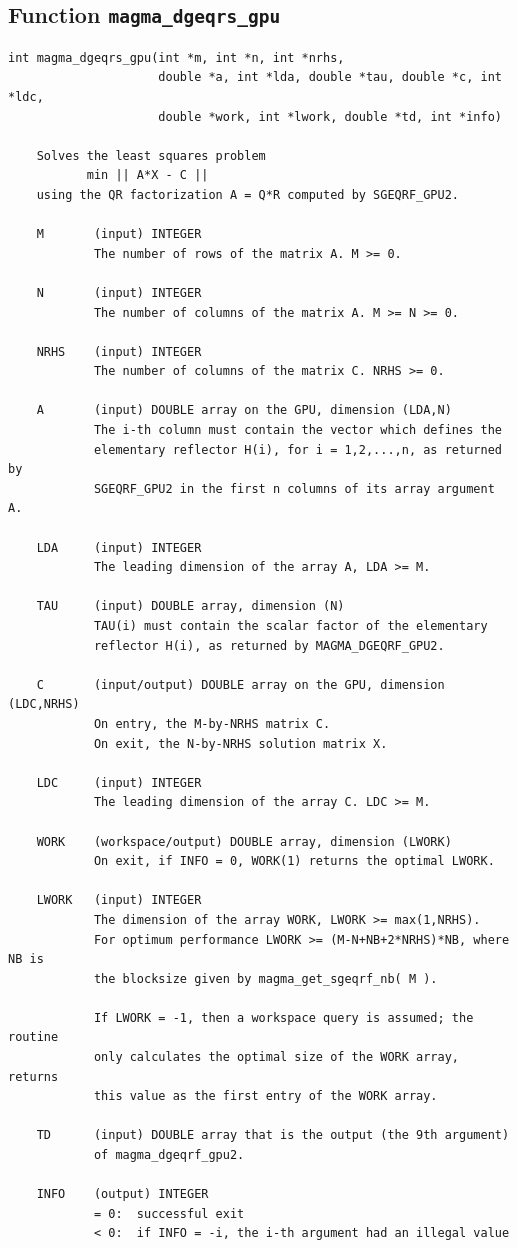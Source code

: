 \documentclass[10pt]{book}
\begin{document}
\subsection{Function {\tt {\bf magma\_dgeqrs\_gpu}}}
\begin{verbatim}
int magma_dgeqrs_gpu(int *m, int *n, int *nrhs,
                     double *a, int *lda, double *tau, double *c, int *ldc,
                     double *work, int *lwork, double *td, int *info)

    Solves the least squares problem
           min || A*X - C ||
    using the QR factorization A = Q*R computed by SGEQRF_GPU2.

    M       (input) INTEGER
            The number of rows of the matrix A. M >= 0.

    N       (input) INTEGER
            The number of columns of the matrix A. M >= N >= 0.

    NRHS    (input) INTEGER
            The number of columns of the matrix C. NRHS >= 0.

    A       (input) DOUBLE array on the GPU, dimension (LDA,N)
            The i-th column must contain the vector which defines the
            elementary reflector H(i), for i = 1,2,...,n, as returned by
            SGEQRF_GPU2 in the first n columns of its array argument A.

    LDA     (input) INTEGER
            The leading dimension of the array A, LDA >= M.

    TAU     (input) DOUBLE array, dimension (N)
            TAU(i) must contain the scalar factor of the elementary
            reflector H(i), as returned by MAGMA_DGEQRF_GPU2.

    C       (input/output) DOUBLE array on the GPU, dimension (LDC,NRHS)
            On entry, the M-by-NRHS matrix C.
            On exit, the N-by-NRHS solution matrix X.

    LDC     (input) INTEGER
            The leading dimension of the array C. LDC >= M.

    WORK    (workspace/output) DOUBLE array, dimension (LWORK)
            On exit, if INFO = 0, WORK(1) returns the optimal LWORK.

    LWORK   (input) INTEGER
            The dimension of the array WORK, LWORK >= max(1,NRHS).
            For optimum performance LWORK >= (M-N+NB+2*NRHS)*NB, where NB is
            the blocksize given by magma_get_sgeqrf_nb( M ).

            If LWORK = -1, then a workspace query is assumed; the routine
            only calculates the optimal size of the WORK array, returns
            this value as the first entry of the WORK array.

    TD      (input) DOUBLE array that is the output (the 9th argument)
            of magma_dgeqrf_gpu2.

    INFO    (output) INTEGER
            = 0:  successful exit
            < 0:  if INFO = -i, the i-th argument had an illegal value
\end{verbatim}
\end{document}
